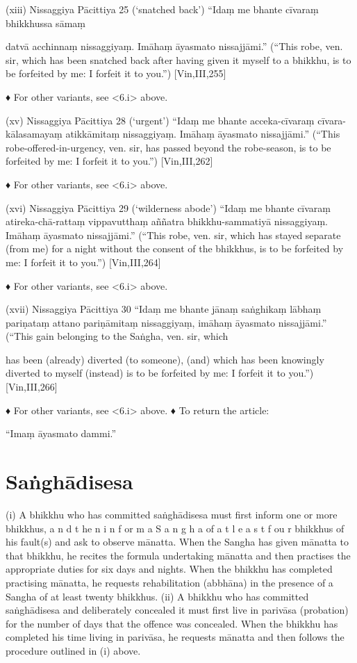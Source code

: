 (xiii) Nissaggiya Pācittiya 25 (‘snatched back’)
“Idaṃ me bhante cīvaraṃ bhikkhussa sāmaṃ

datvā acchinnaṃ nissaggiyaṃ.
Imāhaṃ āyasmato nissajjāmi.”
(“This robe, ven. sir, which has been snatched back
after having given it myself to a bhikkhu, is to be
forfeited by me: I forfeit it to you.”) [Vin,III,255]

♦ For other variants, see <6.i> above.

(xv) Nissaggiya Pācittiya 28 (‘urgent’)
“Idaṃ me bhante acceka-cīvaraṃ cīvara-kālasamayaṃ atikkāmitaṃ nissaggiyaṃ.
Imāhaṃ āyasmato nissajjāmi.”
(“This robe-offered-in-urgency, ven. sir, has passed
beyond the robe-season, is to be forfeited by me: I
forfeit it to you.”)
[Vin,III,262]

♦ For other variants, see <6.i> above.

(xvi) Nissaggiya Pācittiya 29 (‘wilderness abode’)
“Idaṃ me bhante cīvaraṃ atireka-chā-rattaṃ
vippavutthaṃ aññatra bhikkhu-sammatiyā
nissaggiyaṃ. Imāhaṃ āyasmato nissajjāmi.”
(“This robe, ven. sir, which has stayed separate (from
me) for a night without the consent of the bhikkhus,
is to be forfeited by me: I forfeit it to you.”) [Vin,III,264]

♦ For other variants, see <6.i> above.

(xvii) Nissaggiya Pācittiya 30
“Idaṃ me bhante jānaṃ saṅghikaṃ lābhaṃ
pariṇataṃ attano pariṇāmitaṃ nissaggiyaṃ,
imāhaṃ āyasmato nissajjāmi.”
(“This gain belonging to the Saṅgha, ven. sir, which

has been (already) diverted (to someone), (and)
which has been knowingly diverted to myself
(instead) is to be forfeited by me: I forfeit it to you.”)
[Vin,III,266]

♦ For other variants, see <6.i> above.
♦ To return the article:

“Imaṃ āyasmato dammi.”

\section{Saṅghādisesa}

(i) A bhikkhu who has committed saṅghādisesa must first inform one or more bhikkhus,
a n d t he n i n f or m a S a n g h a of a t l e a s t f ou r
bhikkhus of his fault(s) and ask to observe
mānatta. When the Sangha has given mānatta
to that bhikkhu, he recites the formula undertaking mānatta and then practises the
appropriate duties for six days and nights.
When the bhikkhu has completed practising
mānatta, he requests rehabilitation (abbhāna)
in the presence of a Sangha of at least twenty
bhikkhus.
(ii) A bhikkhu who has committed saṅghādisesa and deliberately concealed it must first
live in parivāsa (probation) for the number of
days that the offence was concealed. When
the bhikkhu has completed his time living in
parivāsa, he requests mānatta and then follows the procedure outlined in (i) above.

